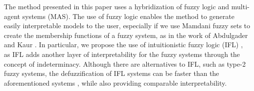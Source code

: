 ﻿\documentclass{ieeeaccess}
\begin{document}


The method presented in this paper uses a hybridization of fuzzy logic
and multi-agent systems (MAS). The use of fuzzy logic enables
the method to generate easily interpretable models to the user,
especially if we use Mamdani fuzzy sets \cite{Mamdani1975} 
to create the membership functions of a fuzzy system, as in the
work of Abdulgader and Kaur \cite{Abdulgader2019}. %
In particular, we
propose the use of intuitionistic fuzzy logic (IFL)
\cite{Atanassov1986} \cite{Atanassov2003}, as IFL adds another layer
of interpretability for the fuzzy systems through the concept of
indeterminacy. Although there are alternatives to IFL, such as type-2
fuzzy systems, the defuzzification of IFL systems can be faster than
the aforementioned systems \cite{Hernandez-Aguila2016}, while also
providing comparable interpretability.
\end{document}
